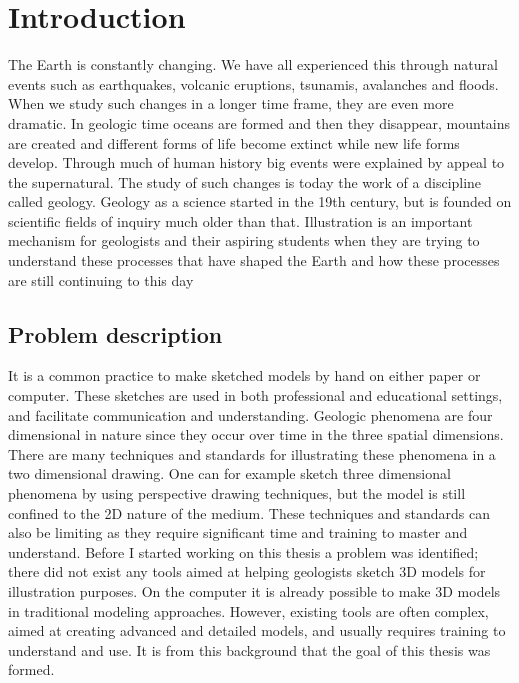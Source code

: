 \documentclass[a4paper,12pt]{report}
\begin{document}
\tableofcontents 



\clearpage


\chapter{Introduction}
\label{sec:intro}

The Earth is constantly changing. We have all experienced this through natural events such as earthquakes, volcanic eruptions, tsunamis, avalanches and floods. When we study such changes in a longer time frame, they are even more dramatic. In geologic time oceans are formed and then they disappear, mountains are created and different forms of life become extinct while new life forms develop. Through much of human history big events were explained by appeal to the supernatural. The study of such changes is today the work of a discipline called geology. Geology as a science started in the 19th century, but is founded on scientific fields of inquiry much older than that. Illustration is an important mechanism for geologists and their aspiring students when they are trying to understand these processes that have shaped the Earth and how these processes are still continuing to this day

\section{Problem description}

It is a common practice to make sketched models by hand on either paper or computer. These sketches are used in both professional and educational settings, and facilitate communication and understanding. Geologic phenomena are four dimensional in nature since they occur over time in the three spatial dimensions. There are many techniques and standards for illustrating these phenomena in a two dimensional drawing. One can for example sketch three dimensional phenomena by using perspective drawing techniques, but the model is still confined to the 2D nature of the medium. These techniques and standards can also be limiting  as they require significant time and training to master and understand. Before I started working on this thesis a problem was identified; there did not exist any tools aimed at helping geologists sketch 3D models for illustration purposes. On the computer it is already possible to make 3D models in traditional modeling approaches. However, existing tools are often complex, aimed at creating advanced and detailed models, and usually requires training to understand and use. It is from this background that the goal of this thesis was formed. 
\end{document}
